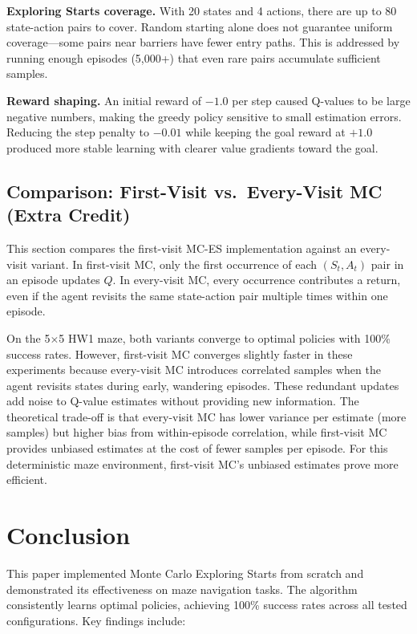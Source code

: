 \documentclass[letterpaper]{article}
\begin{document}
\textbf{Exploring Starts coverage.} With 20 states and 4 actions, there are up to 80 state-action pairs to cover. Random starting alone does not guarantee uniform coverage---some pairs near barriers have fewer entry paths. This is addressed by running enough episodes (5,000+) that even rare pairs accumulate sufficient samples.

\textbf{Reward shaping.} An initial reward of $-1.0$ per step caused Q-values to be large negative numbers, making the greedy policy sensitive to small estimation errors. Reducing the step penalty to $-0.01$ while keeping the goal reward at $+1.0$ produced more stable learning with clearer value gradients toward the goal.

\subsection{Comparison: First-Visit vs.\ Every-Visit MC (Extra Credit)}

This section compares the first-visit MC-ES implementation against an every-visit variant. In first-visit MC, only the first occurrence of each $(S_t, A_t)$ pair in an episode updates $Q$. In every-visit MC, every occurrence contributes a return, even if the agent revisits the same state-action pair multiple times within one episode.

On the 5$\times$5 HW1 maze, both variants converge to optimal policies with 100\% success rates. However, first-visit MC converges slightly faster in these experiments because every-visit MC introduces correlated samples when the agent revisits states during early, wandering episodes. These redundant updates add noise to Q-value estimates without providing new information. The theoretical trade-off is that every-visit MC has lower variance per estimate (more samples) but higher bias from within-episode correlation, while first-visit MC provides unbiased estimates at the cost of fewer samples per episode. For this deterministic maze environment, first-visit MC's unbiased estimates prove more efficient.

\section{Conclusion}

This paper implemented Monte Carlo Exploring Starts from scratch and demonstrated its effectiveness on maze navigation tasks. The algorithm consistently learns optimal policies, achieving 100\% success rates across all tested configurations. Key findings include:
\end{document}
